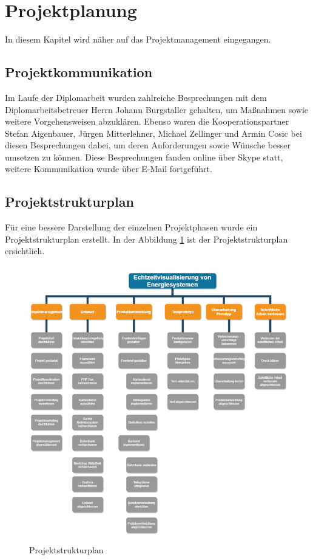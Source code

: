 \newpage
\section{Projektplanung}
	
In diesem Kapitel wird näher auf das Projektmanagement eingegangen.


\subsection{Projektkommunikation}
Im Laufe der Diplomarbeit wurden zahlreiche Besprechungen mit dem Diplomarbeitsbetreuer Herrn Johann Burgstaller gehalten, um Maßnahmen sowie weitere Vorgehensweisen abzuklären. Ebenso waren die Kooperationspartner Stefan Aigenbauer, Jürgen Mitterlehner, Michael Zellinger und Armin Cosic bei diesen Besprechungen dabei, um deren Anforderungen sowie Wünsche besser umsetzen zu können. Diese Besprechungen fanden online über Skype statt, weitere Kommunikation wurde über E-Mail fortgeführt. 


\subsection{Projektstrukturplan}
Für eine bessere Darstellung der einzelnen Projektphasen wurde ein Projektstrukturplan erstellt. In der Abbildung \ref{fig:Projektstrukturplan }  ist der Projektstrukturplan ersichtlich.
\begin{figure}[h]
	\centering
	\includegraphics[height=12cm,width=14cm]{images/Projektstrukturplan}
	\caption{Projektstrukturplan}
	\label{fig:Projektstrukturplan }
\end{figure} 



